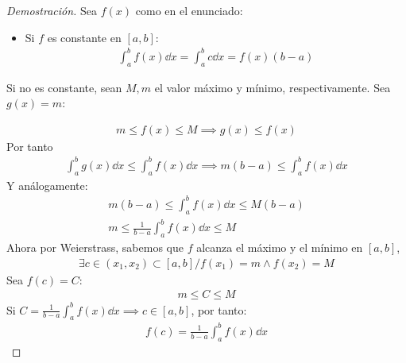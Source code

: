 \documentclass{article}
\begin{document}
\begin{proof}[Demostración]
    Sea $f(x)$ como en el enunciado:
    \begin{itemize}
        \item Si $f$ es constante en $[a,b]$:
        \begin{equation}
            \begin{split}
                \int _{a}^b f(x) \dd{x} = \int _{a}^b c \dd{x} = f(x)(b-a)
            \end{split}
        \end{equation}
    \end{itemize}
    \item Si no es constante, sean $M,m$ el valor máximo y mínimo, respectivamente. Sea $g(x) = m$:
    \item \begin{equation}
        \begin{split}
            m \leq f(x) \leq M \implies g(x) \leq f(x)
        \end{split}
    \end{equation}
    Por tanto
    \begin{equation}
        \begin{split}
            \int _{a}^b g(x) \dd{x} \leq \int _{a}^b f(x) \dd{x} \implies m(b-a) \leq \int _{a}^b f(x) \dd{x}
        \end{split}
    \end{equation}
    Y análogamente:
    \begin{equation}
        \begin{split}
            m(b-a) \leq \int _{a}^b f(x) \dd{x} \leq M(b-a)\\
            m \leq \frac{1}{b-a} \int _{a}^b f(x) \dd{x} \leq M
        \end{split}
    \end{equation}
    Ahora por Weierstrass, sabemos que $f$ alcanza el máximo y el mínimo en $[a,b]$,
    \begin{equation}
        \begin{split}
            \exists c \in (x_{1},x_{2}) \subset [a,b] / f(x_{1})=m \wedge f(x_{2})=M
        \end{split}
    \end{equation}
    Sea $f(c)=C$:
    \begin{equation}
        \begin{split}
            m \leq C \leq M
        \end{split}
    \end{equation}
    Si $C= \frac{1}{b-a} \int _{a}^b f(x) \dd{x} \implies  c \in [a,b]$, por tanto:
    \begin{equation}
        \begin{split}
            f(c)= \frac{1}{b-a} \int _{a}^b f(x) \dd{x}
        \end{split}
    \end{equation}
\end{proof}
\end{document}
